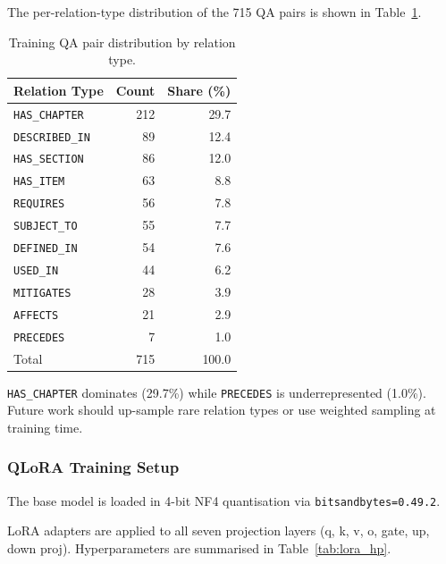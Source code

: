 \documentclass[twocolumn]{article}
\begin{document}
The per-relation-type distribution of the 715 QA pairs is shown in Table~\ref{tab:qa_dist}.

\begin{table}[H]
  \centering
  \caption{Training QA pair distribution by relation type.}
  \label{tab:qa_dist}
  \begin{tabular}{lrr}
    \toprule
    Relation Type & Count & Share (\%) \\
    \midrule
    \texttt{HAS\_CHAPTER}   & 212 & 29.7 \\
    \texttt{DESCRIBED\_IN}  &  89 & 12.4 \\
    \texttt{HAS\_SECTION}   &  86 & 12.0 \\
    \texttt{HAS\_ITEM}      &  63 &  8.8 \\
    \texttt{REQUIRES}       &  56 &  7.8 \\
    \texttt{SUBJECT\_TO}    &  55 &  7.7 \\
    \texttt{DEFINED\_IN}    &  54 &  7.6 \\
    \texttt{USED\_IN}       &  44 &  6.2 \\
    \texttt{MITIGATES}      &  28 &  3.9 \\
    \texttt{AFFECTS}        &  21 &  2.9 \\
    \texttt{PRECEDES}       &   7 &  1.0 \\
    \midrule
    Total & 715 & 100.0 \\
    \bottomrule
  \end{tabular}
\end{table}

\texttt{HAS\_CHAPTER} dominates (29.7\%) while \texttt{PRECEDES} is underrepresented (1.0\%).
Future work should up-sample rare relation types or use weighted sampling at training time.

\subsubsection{QLoRA Training Setup}

\begin{sloppypar}
The base model is  loaded in
4-bit NF4 quantisation via \texttt{bitsandbytes=0.49.2}.
\end{sloppypar}
LoRA adapters are applied to all seven projection layers
(q, k, v, o, gate, up, down proj).
Hyperparameters are summarised in Table~\ref{tab:lora_hp}.
\end{document}
